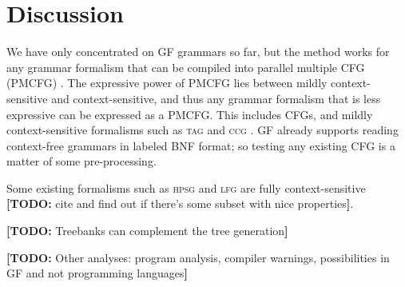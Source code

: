 \documentclass[11pt]{article}
\def\lfg{\textsc{lfg}}
\def\ccg{\textsc{ccg}}
\def\tag{\textsc{tag}}
\def\hpsg{\textsc{hpsg}}
\newcommand{\todo}[1]{{\color{cyan}\textbf{[TODO: }#1\textbf{]}}}
\begin{document}



\section{Discussion}

We have only concentrated on GF grammars so far, but the method works
for any grammar formalism that can be compiled into parallel
multiple CFG (PMCFG) \cite{seki91pmcfg}. The expressive power of PMCFG lies
between mildly context-sensitive and context-sensitive, and thus any
grammar formalism that is less expressive can be expressed as a
PMCFG. This includes CFGs, and mildly context-sensitive formalisms
such as \tag{} \cite{joshi1975tag} and \ccg{} \cite{steedman1988ccg}. GF
already supports reading context-free grammars in labeled BNF format;
so testing any existing CFG is a matter of some pre-processing.

Some existing formalisms such as \hpsg{} and \lfg{} are fully
context-sensitive \todo{cite and find out if there's some subset with
  nice properties}.

\todo{Treebanks can complement the tree generation}

\todo{Other analyses: program analysis, compiler warnings,
  possibilities in GF and not programming languages}
\end{document}
